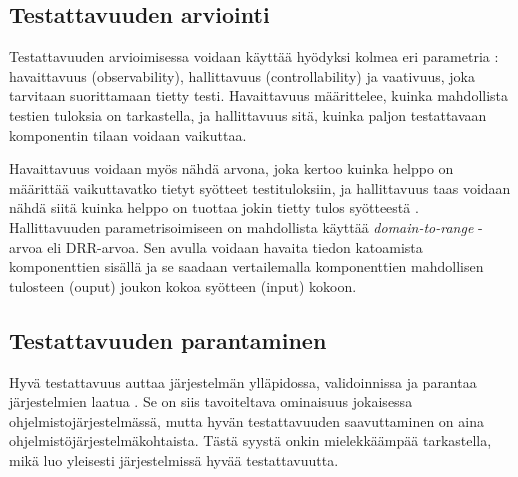 \documentclass[finnish]{tktltiki2}
\numberwithin{table}{section}
\theoremstyle{definition}
\theoremstyle{remark}
\begin{document}
\subsection{Testattavuuden arviointi} \label{contro_and_observ}

Testattavuuden arvioimisessa voidaan käyttää hyödyksi kolmea eri parametria \citep[s. 2]{baudry_measuring_2003}: havaittavuus (observability), hallittavuus (controllability) ja vaativuus, joka tarvitaan suorittamaan tietty testi. Havaittavuus määrittelee, kuinka mahdollista testien tuloksia on tarkastella, ja hallittavuus sitä, kuinka paljon testattavaan komponentin tilaan voidaan vaikuttaa. 

Havaittavuus voidaan myös nähdä arvona, joka kertoo kuinka helppo on määrittää vaikuttavatko tietyt syötteet testituloksiin, ja hallittavuus taas voidaan nähdä siitä kuinka helppo on tuottaa jokin tietty tulos syötteestä \citep[s. 554]{Freedman:1991:TSC:126218.126229}. 
Hallittavuuden parametrisoimiseen on mahdollista käyttää \textit{domain-to-range} -arvoa eli DRR-arvoa. Sen avulla voidaan havaita tiedon katoamista komponenttien sisällä \citep{Voas:1995:STN:624607.625469} ja se saadaan vertailemalla komponenttien mahdollisen tulosteen (ouput) joukon kokoa syötteen (input) kokoon. 





\subsection{Testattavuuden parantaminen}


Hyvä testattavuus auttaa järjestelmän ylläpidossa, validoinnissa ja parantaa järjestelmien laatua \citep[s. 20]{Voas:1995:STN:624607.625469}. Se on siis tavoiteltava ominaisuus jokaisessa ohjelmistojärjestelmässä, mutta hyvän testattavuuden saavuttaminen on aina ohjelmistöjärjestelmäkohtaista. Tästä syystä onkin mielekkäämpää tarkastella, mikä luo yleisesti järjestelmissä hyvää testattavuutta. 


\end{document}
